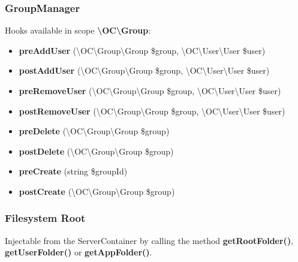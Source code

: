 \documentclass[letterpaper,10pt,english]{sphinxmanual}
\begin{document}
\subsubsection{GroupManager}
\label{app/hooks:groupmanager}
Hooks available in scope \textbf{\textbackslash{}OC\textbackslash{}Group}:
\begin{itemize}
\item {} 
\textbf{preAddUser} (\textbackslash{}OC\textbackslash{}Group\textbackslash{}Group \$group, \textbackslash{}OC\textbackslash{}User\textbackslash{}User \$user)

\item {} 
\textbf{postAddUser} (\textbackslash{}OC\textbackslash{}Group\textbackslash{}Group \$group, \textbackslash{}OC\textbackslash{}User\textbackslash{}User \$user)

\item {} 
\textbf{preRemoveUser} (\textbackslash{}OC\textbackslash{}Group\textbackslash{}Group \$group, \textbackslash{}OC\textbackslash{}User\textbackslash{}User \$user)

\item {} 
\textbf{postRemoveUser} (\textbackslash{}OC\textbackslash{}Group\textbackslash{}Group \$group, \textbackslash{}OC\textbackslash{}User\textbackslash{}User \$user)

\item {} 
\textbf{preDelete} (\textbackslash{}OC\textbackslash{}Group\textbackslash{}Group \$group)

\item {} 
\textbf{postDelete} (\textbackslash{}OC\textbackslash{}Group\textbackslash{}Group \$group)

\item {} 
\textbf{preCreate} (string \$groupId)

\item {} 
\textbf{postCreate} (\textbackslash{}OC\textbackslash{}Group\textbackslash{}Group \$group)

\end{itemize}


\subsubsection{Filesystem Root}
\label{app/hooks:filesystem-root}
Injectable from the ServerContainer by calling the method \textbf{getRootFolder()}, \textbf{getUserFolder()} or \textbf{getAppFolder()}.
\end{document}
